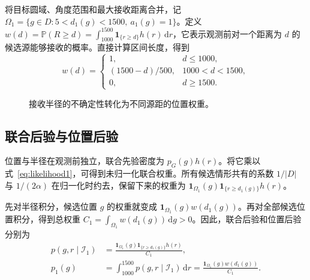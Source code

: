 \documentclass[UTF8,a4paper,zihao=-4,fontset=none]{ctexart}
\numberwithin{equation}{section}
\newcommand{\ind}{\mathbf 1}
\newcommand{\dd}{\,\mathrm d}
\newcommand{\Prob}{\mathbb P}
\begin{document}
将目标圆域、角度范围和最大接收距离合并，记 \(\Omega_1=\{g\in D:5<d_1(g)<1500,\ a_1(g)=1\}\)。定义 \(w(d)=\Prob(R\ge d)=\int_{1000}^{1500}\ind_{\{r\ge d\}}h(r)\dd r\)，它表示观测前对一个距离为 \(d\) 的候选源能够接收的概率。直接计算区间长度，得到
\begin{equation}\label{eq:tail}
 w(d)=
 \begin{cases}
 1,&d\le1000,\\
 (1500-d)/500,&1000<d<1500,\\
 0,&d\ge1500.
 \end{cases}
\end{equation}

\begin{figure}[H]\centering
{}
\caption{接收半径的不确定性转化为不同源距的位置权重。}
\end{figure}

\subsection{联合后验与位置后验}
位置与半径在观测前独立，联合先验密度为 \(p_G(g)h(r)\)。将它乘以式~\eqref{eq:likelihood1}，可得到未归一化联合权重。所有候选情形共有的系数 \(1/|D|\) 与 \(1/(2\alpha)\) 在归一化时约去，保留下来的权重为 \(\ind_{\Omega_1}(g)\ind_{\{r\ge d_1(g)\}}h(r)\)。

先对半径积分，候选位置 \(g\) 的权重就变成 \(\ind_{\Omega_1}(g)w(d_1(g))\)。再对全部候选位置积分，得到总权重 \(C_1=\int_{\Omega_1}w(d_1(g))\dd g>0\)。因此，联合后验和位置后验分别为
\begin{equation}\label{eq:posterior1}
\begin{aligned}
p(g,r\mid\mathcal I_1)
&=\frac{\ind_{\Omega_1}(g)\ind_{\{r\ge d_1(g)\}}h(r)}{C_1},\\
p_1(g)
&=\int_{1000}^{1500}p(g,r\mid\mathcal I_1)\dd r
=\frac{\ind_{\Omega_1}(g)w(d_1(g))}{C_1}.
\end{aligned}
\end{equation}
\end{document}

